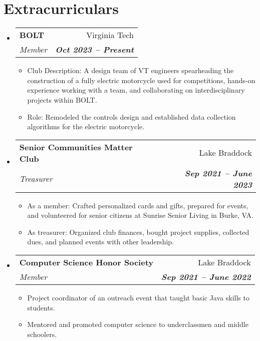 \documentclass[letterpaper, 9pt]{article}
\makeatletter
\newcommand{\resumeItem}[1]{
  \item\small{
    {#1 \vspace{-2pt}}
  }
}
\newcommand{\resumeSubheading}[4]{
  \vspace{-2pt}\item
    \begin{tabular*}{0.97\textwidth}[t]{l@{\extracolsep{\fill}}r}
      \textbf{#1} & #2 \\
      \textit{\small#3} & \textit{\small #4} \\
    \end{tabular*}\vspace{-7pt}
}
\newcommand{\resumeSubHeadingListStart}{\begin{itemize}[leftmargin=0.15in, label={}]}
\newcommand{\resumeSubHeadingListEnd}{\end{itemize}}
\newcommand{\resumeItemListStart}{\begin{itemize}}
\newcommand{\resumeItemListEnd}{\end{itemize}\vspace{-5pt}}
\makeatother
\begin{document}

\section{Extracurriculars}
  \vspace{3pt}
  \resumeSubHeadingListStart

	\resumeSubheading
       {BOLT}{Virginia Tech}
       {Member}{\textbf{Oct 2023 \textbf{--} Present}}
        \resumeItemListStart
            \resumeItem{Club Description: A design team of VT engineers spearheading the construction of a fully electric motorcycle used for competitions, hands-on experience working with a team, and collaborating on interdisciplinary projects within BOLT.}
	     \resumeItem{Role: Remodeled the controls design and established data collection algorithms for the electric motorcycle.}
        \resumeItemListEnd

	\resumeSubheading
      {Senior Communities Matter Club}{Lake Braddock}
      {Treasurer}{\textbf{Sep 2021 \textbf{--} June 2023}}
        \resumeItemListStart
            \resumeItem{As a member: Crafted personalized cards and gifts, prepared for events, and volunteered for senior citizens at Sunrise Senior Living in Burke, VA.}
	     \resumeItem{As treasurer: Organized club finances, bought project supplies, collected dues, and planned events with other leadership.}
        \resumeItemListEnd
	
	\resumeSubheading
      {Computer Science Honor Society}{Lake Braddock}
      {Member}{\textbf{Sep 2021 \textbf{--} June 2022}}
        \resumeItemListStart
	  \resumeItem{Project coordinator of an outreach event that taught basic Java skills to students.}
            \resumeItem{Mentored and promoted computer science to underclassmen and middle schoolers.}
        \resumeItemListEnd
	
        
  \resumeSubHeadingListEnd
\end{document}
